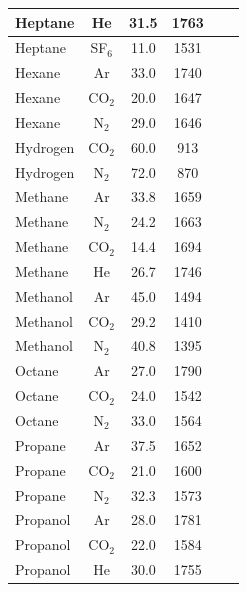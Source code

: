 \begin{table}[p]
\begin{tabular}{|l|c|c|c|c|l|}
Heptane    & He      & 31.5 & 1763 & \cite{Sheinson:FSJ,Grosshandler:Cup}  \\ \hline
Heptane    & SF$_6$  & 11.0 & 1531 & \cite{Sheinson:FSJ}  \\ \hline
Hexane     & Ar      & 33.0 & 1740 & \cite{Moore:1}  \\ \hline
Hexane     & CO$_2$  & 20.0 & 1647 & \cite{Yamamoto:1}  \\ \hline
Hexane     & N$_2$   & 29.0 & 1646 & \cite{Tapscott:1,Yamamoto:1}  \\ \hline
Hydrogen   & CO$_2$  & 60.0 &  913 & \cite{Yamamoto:1}  \\ \hline
Hydrogen   & N$_2$   & 72.0 &  870 & \cite{Yamamoto:1}  \\ \hline
Methane    & Ar      & 33.8 & 1659 & \cite{Tapscott:1,Takahashi:CS2007,Moore:1}  \\ \hline
Methane    & N$_2$   & 24.2 & 1663 & \cite{Takahashi:CS2007,Yamamoto:1,Ural:1}  \\ \hline
Methane    & CO$_2$  & 14.4 & 1694 & \cite{Yamamoto:1,Sakei:1}  \\ \hline
Methane    & He      & 26.7 & 1746 & \cite{Takahashi:CS2007}  \\ \hline
Methanol   & Ar      & 45.0 & 1494 & \cite{Tapscott:1,Moore:1}  \\ \hline
Methanol   & CO$_2$  & 29.2 & 1410 & \cite{Yamamoto:1,Sakei:1}  \\ \hline
Methanol   & N$_2$   & 40.8 & 1395 & \cite{Tapscott:1,Yamamoto:1,Sakei:1}  \\ \hline
Octane     & Ar      & 27.0 & 1790 & \cite{Moore:1}  \\ \hline
Octane     & CO$_2$  & 24.0 & 1542 & \cite{Yamamoto:1}  \\ \hline
Octane     & N$_2$   & 33.0 & 1564 & \cite{Tapscott:1,Yamamoto:1}  \\ \hline
Propane    & Ar      & 37.5 & 1652 & \cite{Tapscott:1,Moore:1}  \\ \hline
Propane    & CO$_2$  & 21.0 & 1600 & \cite{Yamamoto:1}  \\ \hline
Propane    & N$_2$   & 32.3 & 1573 & \cite{Hamins:CS1998,Yamamoto:1,Ural:1}  \\ \hline
Propanol   & Ar      & 28.0 & 1781 & \cite{Moore:1}  \\ \hline
Propanol   & CO$_2$  & 22.0 & 1584 & \cite{Yamamoto:1}  \\ \hline
Propanol   & He      & 30.0 & 1755 & \cite{Sheinson:FSJ}  \\ \hline

\end{tabular}
\end{table}
